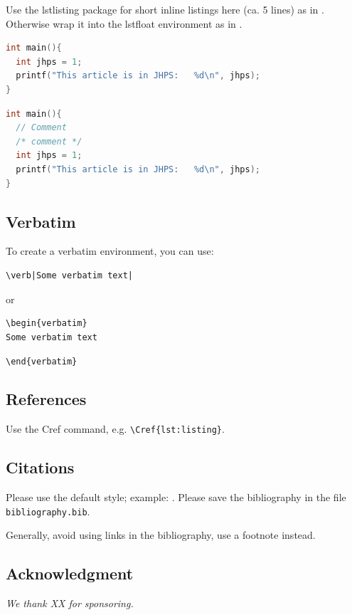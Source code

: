 \documentclass{jhps}
\begin{document}
Use the lstlisting package for short inline listings here (ca.
5 lines) as in .
Otherwise wrap it into the lstfloat environment as in .

\begin{lstlisting}[caption="My listing",label=lst:listing,language=C]
int main(){
  int jhps = 1;
  printf("This article is in JHPS:   %d\n", jhps);
}
\end{lstlisting}

\begin{lstfloat}
  \begin{lstlisting}[caption="My longer listing",label=lst:longlisting,language=C]
int main(){
  // Comment
  /* comment */
  int jhps = 1;
  printf("This article is in JHPS:   %d\n", jhps);
}
  \end{lstlisting}
\end{lstfloat}

\subsection{Verbatim}
To create a verbatim environment, you can use:
\begin{verbatim}
\verb|Some verbatim text|
\end{verbatim}
or
\begin{verbatim}
\begin{verbatim}
Some verbatim text
\end{verbatim}
\vspace*{-0.8em}
\verb|\end{verbatim}|

\subsection{References}

Use the Cref command, e.g. \verb|\Cref{lst:listing}|.\subsection{Citations}

Please use the default style; example: \cite{misc1998}.
Please save the bibliography in the file \texttt{bibliography.bib}.

Generally, avoid using links in the bibliography, use a footnote instead.

\subsection*{Acknowledgment} %
\textit{We thank XX for sponsoring.}
\end{document}
